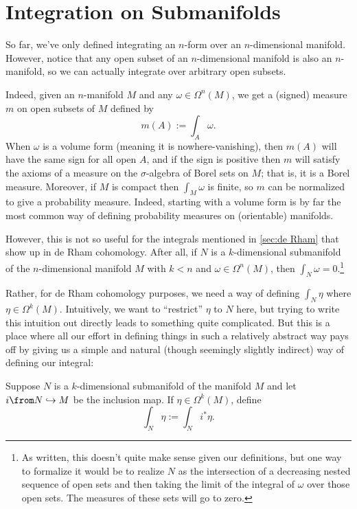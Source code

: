 
\section{Integration on Submanifolds}
\label{sec:integration on submanifolds}

So far, we've only defined integrating an $n$-form over an $n$-dimensional manifold. However, notice that any open subset of an $n$-dimensional manifold is also an $n$-manifold, so we can actually integrate over arbitrary open subsets.

Indeed, given an $n$-manifold $M$ and any $\omega \in \Omega^n(M)$, we get a (signed) measure $m$ on open subsets of $M$ defined by
\[
	m(A):=\int_A \omega.
\]
When $\omega $ is a volume form (meaning it is nowhere-vanishing), then $m(A)$ will have the same sign for all open $A$, and if the sign is positive then $m$ will satisfy the axioms of a measure on the $\sigma$-algebra of Borel sets on $M$; that is, it is a Borel measure. Moreover, if $M$ is compact then $\int_M \omega$ is finite, so $m$ can be normalized to give a probability measure. Indeed, starting with a volume form is by far the most common way of defining probability measures on (orientable) manifolds.

However, this is not so useful for the integrals mentioned in \cref{sec:de Rham} that show up in de Rham cohomology. After all, if $N$ is a $k$-dimensional submanifold of the $n$-dimensional manifold $M$  with $k < n$ and $\omega \in \Omega^n(M)$, then $\int_N \omega = 0$.\footnote{As written, this doesn't quite make sense given our definitions, but one way to formalize it would be to realize $N$ as the intersection of a decreasing nested sequence of open sets and then taking the limit of the integral of $\omega$ over those open sets. The measures of these sets will go to zero.}

Rather, for de Rham cohomology purposes, we need a way of defining $\int_N \eta$ where $\eta \in \Omega^k(M)$. Intuitively, we want to ``restrict'' $\eta$ to $N$ here, but trying to write this intuition out directly leads to something quite complicated. But this is a place where all our effort in defining things in such a relatively abstract way pays off by giving us a simple and natural (though seemingly slightly indirect) way of defining our integral:

\begin{definition}\label{def:integration on submanifold}
	Suppose $N$ is a $k$-dimensional submanifold of the manifold $M$ and let $i \from N \hookrightarrow M$ be the inclusion map. If $\eta \in \Omega^k(M)$, define
	\[
		\int_N \eta := \int_N i^\ast \eta.
	\]
\end{definition}

